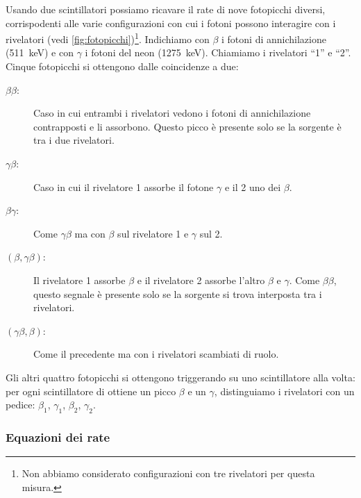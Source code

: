 Usando due scintillatori possiamo ricavare il rate di nove fotopicchi diversi,
corrispodenti alle varie configurazioni con cui i fotoni possono interagire con i rivelatori
(vedi \autoref{fig:fotopicchi})\footnote{Non abbiamo considerato configurazioni con tre rivelatori per questa misura.}.
Indichiamo con $\beta$ i fotoni di annichilazione (\SI{511}{keV})
e con $\gamma$ i fotoni del neon (\SI{1275}{keV}).
Chiamiamo i rivelatori ``1'' e ``2''.
Cinque fotopicchi si ottengono dalle coincidenze a due:
\begin{description}
	\item[$\beta\beta$:]
	Caso in cui entrambi i rivelatori vedono i fotoni di annichilazione contrapposti e li assorbono.
	Questo picco è presente solo se la sorgente è tra i due rivelatori.
	\item[$\gamma\beta$:]
	Caso in cui il rivelatore 1 assorbe il fotone $\gamma$ e il 2 uno dei $\beta$.
	\item[$\beta\gamma$:]
	Come $\gamma\beta$ ma con $\beta$ sul rivelatore 1 e $\gamma$ sul 2.
	\item[$(\beta,\gamma\beta)$:]
	Il rivelatore 1 assorbe $\beta$ e il rivelatore 2 assorbe l'altro $\beta$ e $\gamma$.
	Come $\beta\beta$, questo segnale è presente solo se la sorgente si trova interposta tra i rivelatori.
	\item[$(\gamma\beta,\beta)$:]
	Come il precedente ma con i rivelatori scambiati di ruolo.
\end{description}
Gli altri quattro fotopicchi si ottengono triggerando su uno scintillatore alla volta:
per ogni scintillatore di ottiene un picco $\beta$ e un $\gamma$,
distinguiamo i rivelatori con un pedice: $\beta_1$, $\gamma_1$, $\beta_2$, $\gamma_2$.

\subsubsection{Equazioni dei rate}

